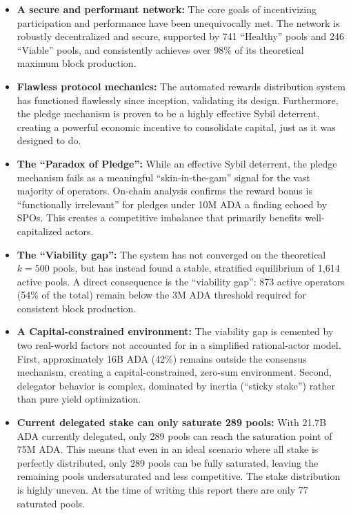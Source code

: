 \documentclass[11pt, letterpaper]{article}
\begin{document}
\begin{itemize}
    \item \textbf{A secure and performant network:} The core goals of incentivizing participation and 
    performance have been unequivocally met. The network is robustly decentralized and secure, supported by 741 
    ``Healthy'' pools and 246 ``Viable'' pools, and consistently achieves over 98\% of its theoretical maximum block 
    production.
    
    \item \textbf{Flawless protocol mechanics:} The automated rewards distribution system has functioned 
    flawlessly since inception, validating its design. Furthermore, the pledge mechanism is proven to be a 
    highly effective Sybil deterrent, creating a powerful economic incentive to consolidate capital, just as it 
    was designed to do.

    \item \textbf{The ``Paradox of Pledge'':} While an effective Sybil deterrent, the pledge mechanism 
    fails as a meaningful ``skin-in-the-gam'' signal for the vast majority of operators. On-chain analysis 
    confirms the reward bonus is ``functionally irrelevant'' for pledges under 10M ADA a finding echoed by SPOs. 
	This creates a competitive imbalance that primarily benefits well-capitalized actors.

    \item \textbf{The ``Viability gap'':} The system has not converged on the theoretical $k=500$ pools, but 
    has instead found a stable, stratified equilibrium of 1,614 active pools. A direct consequence is the 
    ``viability gap'': 873 active operators (54\% of the total) remain below the 3M ADA threshold required for 
    consistent block production.
    
    \item \textbf{A Capital-constrained environment:} The viability gap is cemented by two real-world factors 
    not accounted for in a simplified rational-actor model. First, approximately 16B ADA (42\%) remains outside the 
    consensus mechanism, creating a capital-constrained, zero-sum environment. Second, delegator behavior is 
    complex, dominated by inertia (``sticky stake'') rather than pure yield optimization.

	\item \textbf{Current delegated stake can only saturate 289 pools:} With 21.7B ADA currently delegated, 
	only 289 pools can reach the saturation point of 75M ADA. This means that even in an ideal scenario where 
	all stake is perfectly distributed, only 289 pools can be fully saturated, leaving the remaining pools 
	undersaturated and less competitive. The stake distribution is highly uneven. At the time of writing this 
	report there are only 77 saturated pools.

\end{itemize}
\end{document}
